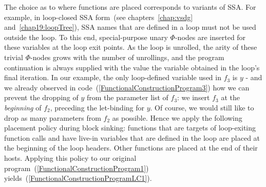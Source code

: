 The choice as to where functions are placed corresponds to variants of
SSA. For example, in loop-closed SSA form~(see
chapters~\ref{chap:vsdg} and~\ref{chap19:loopTree}), SSA names that
are defined in a loop must not be used outside the loop. To this end,
special-purpose unary $\Phi$-nodes are inserted for these variables at
the loop exit points. As the loop is unrolled, the arity of these
trivial $\Phi$-nodes grows with the number of unrollings, and the
program continuation is always supplied with the value the variable
obtained in the loop's final iteration.  In our example, the only
loop-defined variable used in $f_3$ is $y$ - and we already observed
in code~(\ref{FunctionalConstructionProgram3}) how we can prevent the
dropping of $y$ from the parameter list of $f_3$: we insert $f_3$ at
the \emph{beginning} of $f_2$, preceding the let-binding for $y$. Of
course, we would still like to drop as many parameters from $f_2$ as
possible. Hence we apply the following placement policy during block
sinking: functions that are targets of loop-exiting function calls and
have live-in variables that are defined in the loop are placed at the
beginning of the loop headers.  Other functions are placed at the end
of their hosts. Applying this policy to our original
program~(\ref{FunctionalConstructionProgram1})
yields~(\ref{FunctionalConstructionProgramLC1}).
